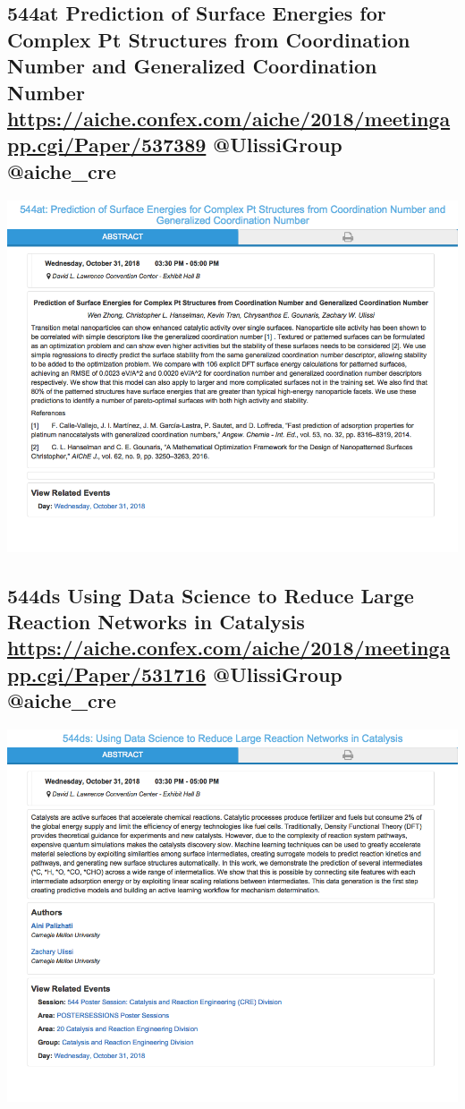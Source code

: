 \documentclass[11pt]{article}
\begin{document}
\subsection{544at Prediction of Surface Energies for Complex Pt Structures from Coordination Number and Generalized Coordination Number  \url{https://aiche.confex.com/aiche/2018/meetingapp.cgi/Paper/537389} @UlissiGroup @aiche\_cre}
\label{sec:org5998a1f}
\begin{center}
\includegraphics[width=.9\linewidth]{./537389.png}
\end{center}
\subsection{544ds Using Data Science to Reduce Large Reaction Networks in Catalysis \url{https://aiche.confex.com/aiche/2018/meetingapp.cgi/Paper/531716} @UlissiGroup @aiche\_cre}
\label{sec:org4952f0c}
\begin{center}
\includegraphics[width=.9\linewidth]{./531716.png}
\end{center}
\end{document}
